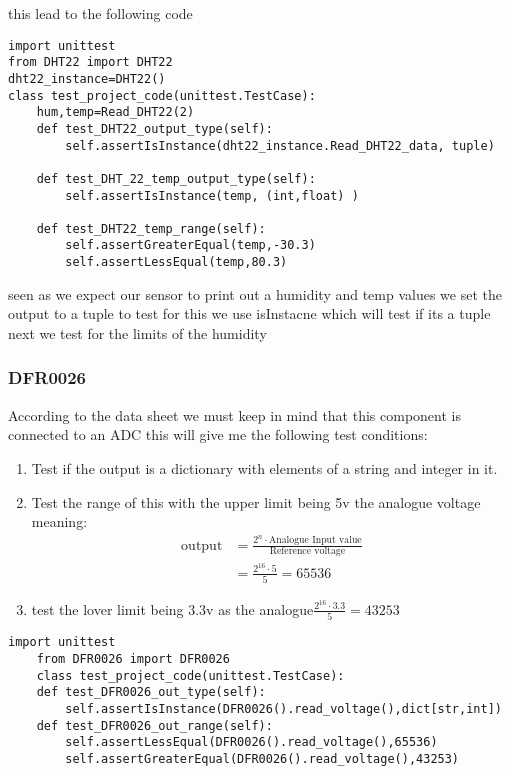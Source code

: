 this lead to the  following code 
\begin{lstlisting}[style=mystyle,caption={sample test for DHT22}]
import unittest
from DHT22 import DHT22
dht22_instance=DHT22()
class test_project_code(unittest.TestCase):
    hum,temp=Read_DHT22(2)
    def test_DHT22_output_type(self):
        self.assertIsInstance(dht22_instance.Read_DHT22_data, tuple)

    def test_DHT_22_temp_output_type(self):
        self.assertIsInstance(temp, (int,float) )

    def test_DHT22_temp_range(self):
        self.assertGreaterEqual(temp,-30.3)
        self.assertLessEqual(temp,80.3)
\end{lstlisting}
seen as we expect our sensor to  print out a humidity and temp values we  set the  output to  a tuple 
to test for this we use isInstacne which will test if its a tuple
next we test for the  limits of the  humidity
\subsubsection{DFR0026}
According to the  data sheet \cite{ada} we must keep in mind  that this  component is  connected to  an ADC 
this  will  give  me  the  following  test conditions:
\begin{enumerate}
    \item Test if  the output is a dictionary with elements of a string and integer in it.

    \item Test  the  range of this  with the  upper limit being 5v the analogue voltage meaning:
    $$\begin{aligned}\text{output}&= \frac{2^n\cdot \text{Analogue Input value}}{\text{Reference voltage}}\\ &=\frac{2^{16}\cdot 5}{5}=65536\end{aligned}$$
    \item test the  lover limit being 3.3v as the analogue$\frac{2^{16}\cdot 3.3}{5}=43253$
\end{enumerate}
\begin{lstlisting}[style=mystyle,caption={unit test for  DFR0026 and  MCP3008}]
    import unittest
    from DFR0026 import DFR0026
    class test_project_code(unittest.TestCase):
    def test_DFR0026_out_type(self):
        self.assertIsInstance(DFR0026().read_voltage(),dict[str,int])
    def test_DFR0026_out_range(self):
        self.assertLessEqual(DFR0026().read_voltage(),65536)
        self.assertGreaterEqual(DFR0026().read_voltage(),43253)
\end{lstlisting}
